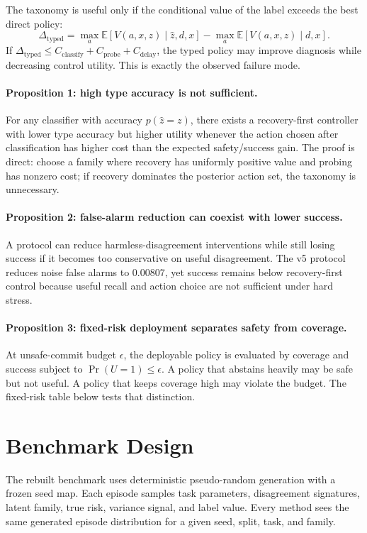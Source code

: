 \documentclass[11pt]{article}
\begin{document}
The taxonomy is useful only if the conditional value of the label exceeds the best direct policy:
\[
  \Delta_\text{typed} =
  \max_a \mathbb{E}[V(a,x,z)\mid \hat z,d,x]
  -
  \max_a \mathbb{E}[V(a,x,z)\mid d,x].
\]
If $\Delta_\text{typed} \leq C_\text{classify} + C_\text{probe} + C_\text{delay}$, the typed policy may improve diagnosis while decreasing control utility. This is exactly the observed failure mode.

\paragraph{Proposition 1: high type accuracy is not sufficient.}
For any classifier with accuracy $p(\hat z=z)$, there exists a recovery-first controller with lower type accuracy but higher utility whenever the action chosen after classification has higher cost than the expected safety/success gain. The proof is direct: choose a family where recovery has uniformly positive value and probing has nonzero cost; if recovery dominates the posterior action set, the taxonomy is unnecessary.

\paragraph{Proposition 2: false-alarm reduction can coexist with lower success.}
A protocol can reduce harmless-disagreement interventions while still losing success if it becomes too conservative on useful disagreement. The v5 protocol reduces noise false alarms to 0.00807, yet success remains below recovery-first control because useful recall and action choice are not sufficient under hard stress.

\paragraph{Proposition 3: fixed-risk deployment separates safety from coverage.}
At unsafe-commit budget $\epsilon$, the deployable policy is evaluated by coverage and success subject to $\Pr(U=1)\leq \epsilon$. A policy that abstains heavily may be safe but not useful. A policy that keeps coverage high may violate the budget. The fixed-risk table below tests that distinction.

\section{Benchmark Design}
The rebuilt benchmark uses deterministic pseudo-random generation with a frozen seed map. Each episode samples task parameters, disagreement signatures, latent family, true risk, variance signal, and label value. Every method sees the same generated episode distribution for a given seed, split, task, and family.
\end{document}
